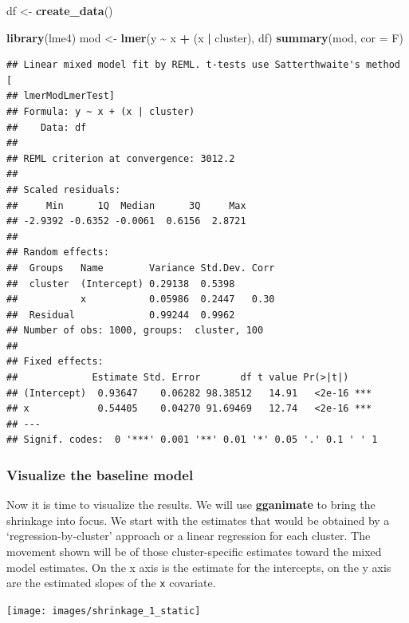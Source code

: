 \documentclass[
  12pt,
]{book}
\newenvironment{Shaded}{\begin{snugshade}}{\end{snugshade}}
\newcommand{\DataTypeTok}[1]{\textcolor[rgb]{0.13,0.29,0.53}{#1}}
\newcommand{\KeywordTok}[1]{\textcolor[rgb]{0.13,0.29,0.53}{\textbf{#1}}}
\newcommand{\NormalTok}[1]{#1}
\newcommand{\OperatorTok}[1]{\textcolor[rgb]{0.81,0.36,0.00}{\textbf{#1}}}
\newcommand{\StringTok}[1]{\textcolor[rgb]{0.31,0.60,0.02}{#1}}
\begin{document}
\begin{Shaded}
\begin{Highlighting}[]
\NormalTok{df \textless{}{-}}\StringTok{ }\KeywordTok{create\_data}\NormalTok{()}

\KeywordTok{library}\NormalTok{(lme4)}
\NormalTok{mod \textless{}{-}}\StringTok{ }\KeywordTok{lmer}\NormalTok{(y }\OperatorTok{\textasciitilde{}}\StringTok{ }\NormalTok{x }\OperatorTok{+}\StringTok{ }\NormalTok{(x }\OperatorTok{|}\StringTok{ }\NormalTok{cluster), df)}
\KeywordTok{summary}\NormalTok{(mod, }\DataTypeTok{cor =}\NormalTok{ F)}
\end{Highlighting}
\end{Shaded}

\begin{verbatim}
## Linear mixed model fit by REML. t-tests use Satterthwaite's method [
## lmerModLmerTest]
## Formula: y ~ x + (x | cluster)
##    Data: df
## 
## REML criterion at convergence: 3012.2
## 
## Scaled residuals: 
##     Min      1Q  Median      3Q     Max 
## -2.9392 -0.6352 -0.0061  0.6156  2.8721 
## 
## Random effects:
##  Groups   Name        Variance Std.Dev. Corr
##  cluster  (Intercept) 0.29138  0.5398       
##           x           0.05986  0.2447   0.30
##  Residual             0.99244  0.9962       
## Number of obs: 1000, groups:  cluster, 100
## 
## Fixed effects:
##             Estimate Std. Error       df t value Pr(>|t|)    
## (Intercept)  0.93647    0.06282 98.38512   14.91   <2e-16 ***
## x            0.54405    0.04270 91.69469   12.74   <2e-16 ***
## ---
## Signif. codes:  0 '***' 0.001 '**' 0.01 '*' 0.05 '.' 0.1 ' ' 1
\end{verbatim}

\hypertarget{visualize-the-baseline-model}{%
\subsubsection{Visualize the baseline model}\label{visualize-the-baseline-model}}

Now it is time to visualize the results. We will use \textbf{gganimate} to bring the shrinkage into focus. We start with the estimates that would be obtained by a `regression-by-cluster' approach or a linear regression for each cluster. The movement shown will be of those cluster-specific estimates toward the mixed model estimates. On the x axis is the estimate for the intercepts, on the y axis are the estimated slopes of the \texttt{x} covariate.

\texttt{[image: images/shrinkage\_1\_static]}
\end{document}
